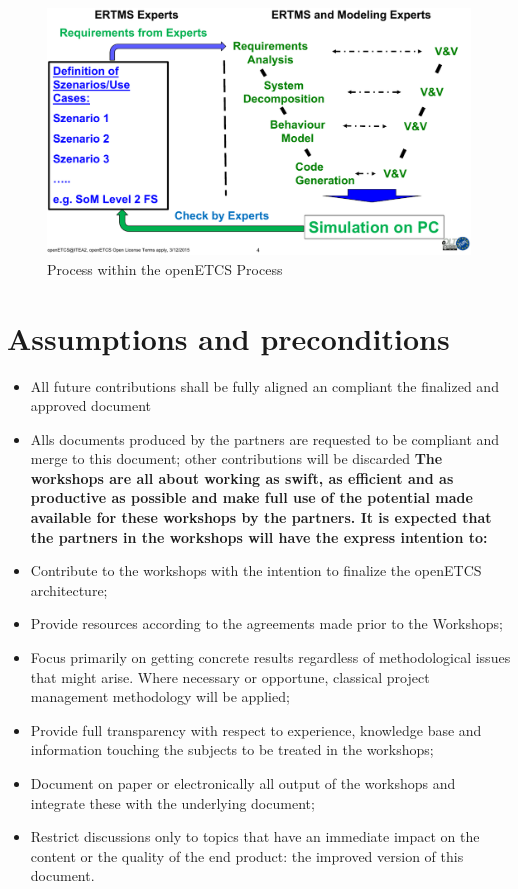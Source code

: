 \begin{figure}[h]
\includegraphics[scale=0.5]{images/Procedure}
\caption{Process within the openETCS Process}
\label{Process within the openETCS Process}
\end{figure}

\section{Assumptions and preconditions}
\begin{itemize}
\item All future contributions shall be fully aligned an compliant the finalized and approved document 
\item Alls documents produced by the partners are requested to be compliant and merge to this document; other contributions will be discarded
\textbf{The workshops are all about working as swift, as efficient and as productive as possible and make full use of the potential made available for these workshops by the partners. It is expected that the partners in the workshops will have the express intention to:}
\item Contribute to the workshops with the intention to finalize the openETCS architecture;\\
\item Provide resources according to the agreements made prior to the Workshops;\\
\item Focus primarily on  getting concrete results regardless of methodological issues that might arise. Where necessary or opportune, classical project management methodology will be applied;\\
\item Provide full transparency with respect to experience, knowledge base and information touching the subjects to be treated in the workshops;\\
\item Document on paper or electronically all output of the workshops and integrate these with the underlying document;\\
\item Restrict discussions only to topics that have an immediate impact on the content or the quality of the end product: the improved version of this document.\\
\end{itemize}

